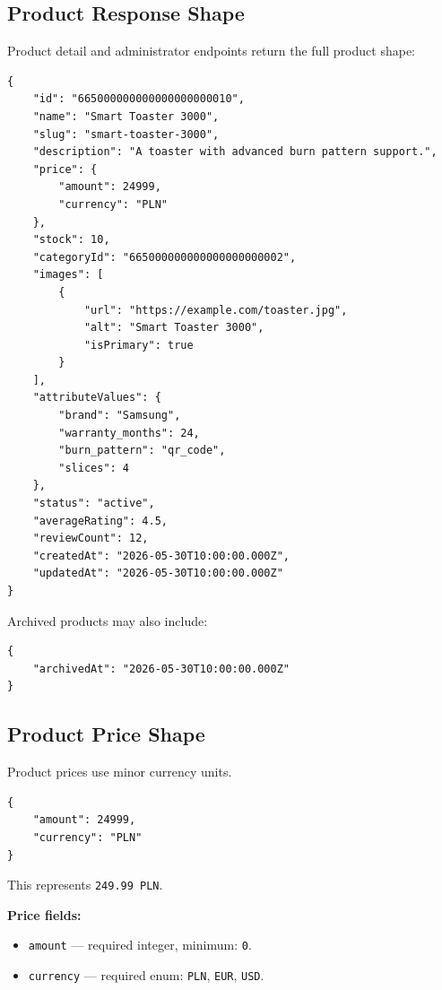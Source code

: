 \subsection{Product Response Shape}

Product detail and administrator endpoints return the full product shape:

\begin{verbatim}
{
    "id": "665000000000000000000010",
    "name": "Smart Toaster 3000",
    "slug": "smart-toaster-3000",
    "description": "A toaster with advanced burn pattern support.",
    "price": {
        "amount": 24999,
        "currency": "PLN"
    },
    "stock": 10,
    "categoryId": "665000000000000000000002",
    "images": [
        {
            "url": "https://example.com/toaster.jpg",
            "alt": "Smart Toaster 3000",
            "isPrimary": true
        }
    ],
    "attributeValues": {
        "brand": "Samsung",
        "warranty_months": 24,
        "burn_pattern": "qr_code",
        "slices": 4
    },
    "status": "active",
    "averageRating": 4.5,
    "reviewCount": 12,
    "createdAt": "2026-05-30T10:00:00.000Z",
    "updatedAt": "2026-05-30T10:00:00.000Z"
}
\end{verbatim}

\pagebreak
Archived products may also include:

\begin{verbatim}
{
    "archivedAt": "2026-05-30T10:00:00.000Z"
}
\end{verbatim}

\subsection{Product Price Shape}

Product prices use minor currency units.

\begin{verbatim}
{
    "amount": 24999,
    "currency": "PLN"
}
\end{verbatim}

This represents \texttt{249.99 PLN}.

\textbf{Price fields:}

\begin{itemize}
    \item \texttt{amount} --- required integer, minimum: \texttt{0}.
    \item \texttt{currency} --- required enum: \texttt{PLN}, \texttt{EUR}, \texttt{USD}.
\end{itemize}

